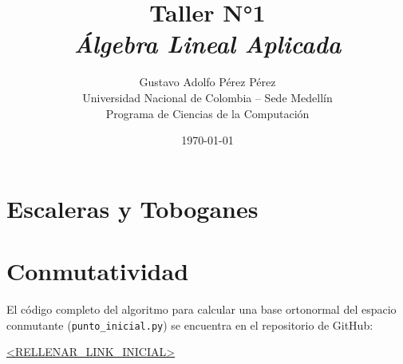 \documentclass{article}
\title{Taller N°1 \\ \textit{Álgebra Lineal Aplicada}}
\author{Gustavo Adolfo P\'erez P\'erez\\Universidad Nacional de Colombia -- Sede Medell\'in\\Programa de Ciencias de la Computaci\'on}
\date{\today}
\begin{document}
\maketitle

\section{Escaleras y Toboganes}





\section{Conmutatividad}
El código completo del algoritmo para calcular una base ortonormal del espacio conmutante (\texttt{punto\_inicial.py}) se encuentra en el repositorio de GitHub:

\begin{center}
\url{<RELLENAR_LINK_INICIAL>}
\end{center}





\end{document}
